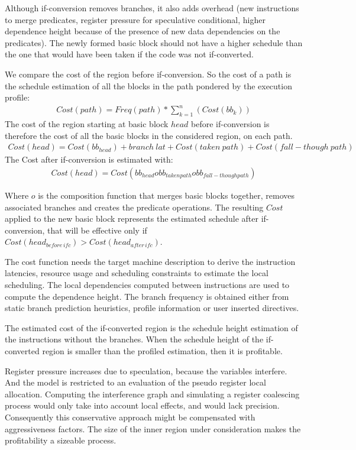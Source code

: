 Although if-conversion removes branches, it also adds overhead (new instructions to merge predicates, register pressure for speculative conditional, higher dependence height because of the presence of new data dependencies on the predicates). The newly formed basic block should not have a higher schedule than the one that would have been taken if the code was not if-converted.

We compare the cost of the region before if-conversion. So the cost of a path is the schedule estimation of all the blocks in the path pondered by the execution profile:
\begin{align}
Cost(path)=Freq(path)*\sum_{k=1}^n(Cost(bb_{k}))
\end{align}
The cost of the region starting at basic block $head$ before if-conversion is therefore the cost of all the basic blocks in the considered region, on each path.
\begin{align}
Cost(head)=Cost(bb_{head})+branch\:lat+Cost(taken\:path)+Cost(fall-though\:path)
\end{align}
The Cost after if-conversion is estimated with:
\begin{align}
Cost(head)=Cost(bb_{head} o bb_{taken path} o bb_{fall-though path})
\end{align}

Where $o$ is the composition function that merges basic blocks together, removes associated branches and creates the predicate operations. The resulting $Cost$ applied to the new basic block represents the estimated schedule after if-conversion, that will be effective only if $Cost(head_{before\,ifc}) > Cost(head_{after\,ifc})$. 
 
The cost function needs the target machine description to derive the instruction latencies, resource usage and scheduling constraints to estimate the local scheduling. The local dependencies computed between instructions are used to compute the dependence height. The branch frequency is obtained either from static branch prediction heuristics, profile information or user inserted directives.

The estimated cost of the if-converted region is the schedule height estimation of the instructions without the branches. When the schedule height of the if-converted region is smaller than the profiled estimation, then it is profitable.

Register pressure increases due to speculation, because the variables interfere. And the model is restricted to an evaluation of the pseudo register local allocation. Computing the interference graph and simulating a register coalescing process would only take into account local effects, and would lack precision. Consequently this conservative approach might be compensated with aggressiveness factors. The size of the inner region under consideration makes the profitability a sizeable process.

